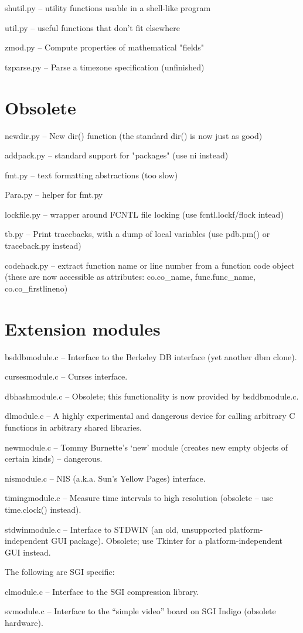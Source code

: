 shutil.py -- utility functions usable in a shell-like program

util.py -- useful functions that don't fit elsewhere

zmod.py -- Compute properties of mathematical "fields"

tzparse.py -- Parse a timezone specification (unfinished)


\section{Obsolete}

newdir.py -- New dir() function (the standard dir() is now just as good)

addpack.py -- standard support for "packages" (use ni instead)

fmt.py -- text formatting abstractions (too slow)

Para.py -- helper for fmt.py

lockfile.py -- wrapper around FCNTL file locking (use
fcntl.lockf/flock intead)

tb.py -- Print tracebacks, with a dump of local variables (use
pdb.pm() or traceback.py instead)

codehack.py -- extract function name or line number from a function
code object (these are now accessible as attributes: co.co_name,
func.func_name, co.co_firstlineno)


\section{Extension modules}

bsddbmodule.c -- Interface to the Berkeley DB interface (yet another
dbm clone).

cursesmodule.c -- Curses interface.

dbhashmodule.c -- Obsolete; this functionality is now provided by
bsddbmodule.c.

dlmodule.c --  A highly experimental and dangerous device for calling
arbitrary C functions in arbitrary shared libraries.

newmodule.c -- Tommy Burnette's `new' module (creates new empty
objects of certain kinds) -- dangerous.

nismodule.c -- NIS (a.k.a. Sun's Yellow Pages) interface.

timingmodule.c -- Measure time intervals to high resolution (obsolete
-- use time.clock() instead).

stdwinmodule.c -- Interface to STDWIN (an old, unsupported
platform-independent GUI package).  Obsolete; use Tkinter for a
platform-independent GUI instead.

The following are SGI specific:

clmodule.c -- Interface to the SGI compression library.

svmodule.c -- Interface to the ``simple video'' board on SGI Indigo
(obsolete hardware).
